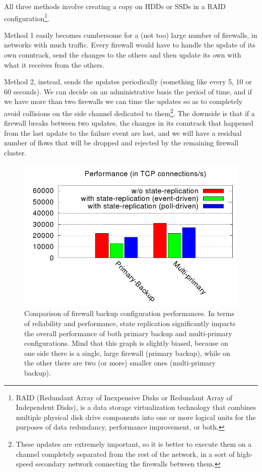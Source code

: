 All three methods involve creating a copy on HDDs or SSDs in a RAID configuration\footnote{RAID (Redundant Array of Inexpensive Disks or Redundant Array of Independent Disks), is a data storage virtualization technology that combines multiple physical disk drive components into one or more logical units for the purposes of data redundancy, performance improvement, or both.}.

Method 1 easily becomes cumbersome for a (not too) large number of firewalls, in networks with much traffic. Every firewall would have to handle the update of its own conntrack, send the changes to the others and then update its own with what it receives from the others.

Method 2, instead, sends the updates periodically (something like every 5, 10 or 60 seconds). We can decide on an administrative basis the period of time, and if we have more than two firewalls we can time the updates so as to completely avoid collisions on the side channel dedicated to them\footnote{These updates are extremely important, so it is better to execute them on a channel completely separated from the rest of the network, in a sort of high-speed secondary network connecting the firewalls between them.}. The downside is that if a firewall breaks between two updates, the changes in its conntrack that happened from the last update to the failure event are lost, and we will have a residual number of flows that will be dropped and rejected by the remaining firewall cluster.

\begin{figure}[h]
    \centering
    \includegraphics[scale=0.7]{img/fw_performance.png}
    \decoRule
    \caption{Comparison of firewall backup configuration performances. In terms of reliability and performance, state replication significantly impacts the overall performance of both primary backup and multi-primary configurations. Mind that this graph is slightly biased, because on one side there is a single, large firewall (primary backup), while on the other there are two (or more) smaller ones (multi-primary backup).}
    \label{fig:fw_performance}
\end{figure}

